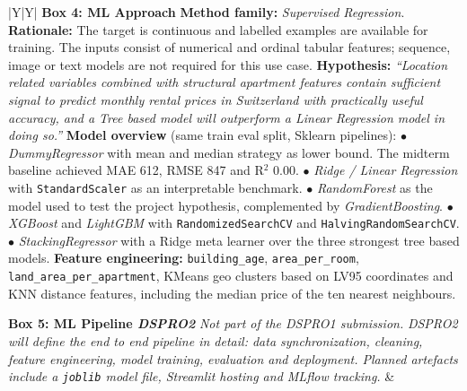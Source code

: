 \documentclass[11pt, a4paper]{article}
\begin{document}
{\begin{xltabular}{\textwidth}{|Y|Y|}
    \textbf{\color{accent}Box 4: ML Approach} \newline
    \textbf{Method family:} \emph{Supervised Regression}.
    \newline\newline
    \textbf{Rationale:} The target is continuous and labelled examples are available for training. The inputs consist of numerical and ordinal tabular features; sequence, image or text models are not required for this use case.
    \newline\newline
    \textbf{Hypothesis:} \emph{``Location related variables combined with structural apartment features contain sufficient signal to predict monthly rental prices in Switzerland with practically useful accuracy, and a Tree based model will outperform a Linear Regression model in doing so.''}
    \newline\newline
    \textbf{Model overview} (same train eval split, Sklearn pipelines):
    \newline $\bullet$ \emph{DummyRegressor} with mean and median strategy as lower bound. The midterm baseline achieved MAE 612, RMSE 847 and R$^2$ 0.00.
    \newline $\bullet$ \emph{Ridge / Linear Regression} with \texttt{StandardScaler} as an interpretable benchmark.
    \newline $\bullet$ \emph{RandomForest} as the model used to test the project hypothesis, complemented by \emph{GradientBoosting}.
    \newline $\bullet$ \emph{XGBoost} and \emph{LightGBM} with \texttt{RandomizedSearchCV} and \texttt{HalvingRandomSearchCV}.
    \newline $\bullet$ \emph{StackingRegressor} with a Ridge meta learner over the three strongest tree based models.
    \newline\newline
    \textbf{Feature engineering:} \texttt{building\_age}, \texttt{area\_per\_room}, \texttt{land\_area\_per\_apartment}, KMeans geo clusters based on LV95 coordinates and KNN distance features, including the median price of the ten nearest neighbours.
    \\ \hline

    \textbf{\color{outscope}Box 5: ML Pipeline \emph{DSPRO2}} \newline
    \textcolor{outscope}{\emph{Not part of the DSPRO1 submission.}}
    \newline\newline
    \textcolor{outscope}{\emph{DSPRO2 will define the end to end pipeline in detail: data synchronization, cleaning, feature engineering, model training, evaluation and deployment. Planned artefacts include a \texttt{joblib} model file, Streamlit hosting and MLflow tracking.}}
    &


\end{xltabular}}
\end{document}
